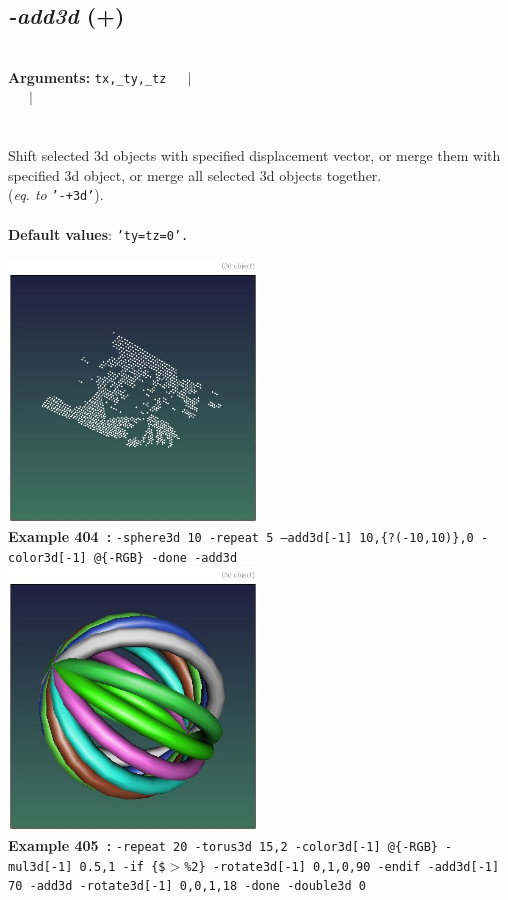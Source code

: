 \documentclass[a4paper,11pt,twoside]{book}
\begin{document}
\subsection{\emph{-add3d} (+)}\vspace*{-0.5em}
~\\\textbf{Arguments: } 
{\small \texttt{tx,\_ty,\_tz}}~~~$|$\\
\hspace*{2.2cm}{\small \texttt{[object3d]}}~~~$|$\\
\\~\\
Shift selected 3d objects with specified displacement vector, or merge them with specified
3d object, or merge all selected 3d objects together.
~\\(\emph{eq. to} {\small \texttt{'-+3d'}}).
~\\~\\\textbf{Default values}: {\small \texttt{'ty=tz=0'.}}
\begin{center}\includegraphics[keepaspectratio=true,height=7cm,width=\textwidth]{img/gmic_def404.jpg}\\
{\footnotesize \textbf{Example 404~:} \texttt{-sphere3d 10 -repeat 5 --add3d[-1] 10,\{?(-10,10)\},0 -color3d[-1] @\{-RGB\} -done -add3d}}
\\\includegraphics[keepaspectratio=true,height=7cm,width=\textwidth]{img/gmic_def405.jpg}\\
{\footnotesize \textbf{Example 405~:} \texttt{-repeat 20 -torus3d 15,2 -color3d[-1] @\{-RGB\} -mul3d[-1] 0.5,1 -if \{\$$>$\%2\} -rotate3d[-1] 0,1,0,90 -endif -add3d[-1] 70 -add3d -rotate3d[-1] 0,0,1,18 -done -double3d 0}}
\end{center}
\end{document}
